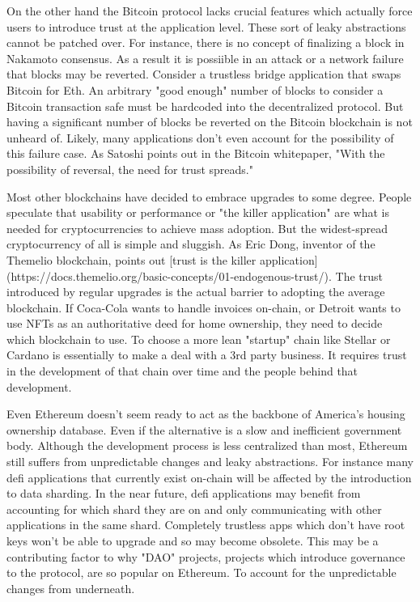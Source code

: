 On the other hand the Bitcoin protocol lacks crucial features which actually force users to introduce trust at the application level. These sort of leaky abstractions cannot be patched over. For instance, there is no concept of finalizing a block in Nakamoto consensus. As a result it is possiible in an attack or a network failure that blocks may be reverted. Consider a trustless bridge application that swaps Bitcoin for Eth. An arbitrary "good enough" number of blocks to consider a Bitcoin transaction safe must be hardcoded into the decentralized protocol. But having a significant number of blocks be reverted on the Bitcoin blockchain is not unheard of. Likely, many applications don't even account for the possibility of this failure case. As Satoshi points out in the Bitcoin whitepaper, "With the possibility of reversal, the need for trust spreads."

Most other blockchains have decided to embrace upgrades to some degree. People speculate that usability or performance or "the killer application" are what is needed for cryptocurrencies to achieve mass adoption. But the widest-spread cryptocurrency of all is simple and sluggish. As Eric Dong, inventor of the Themelio blockchain, points out [trust is the killer application](https://docs.themelio.org/basic-concepts/01-endogenous-trust/). The trust introduced by regular upgrades is the actual barrier to adopting the average blockchain. If Coca-Cola wants to handle invoices on-chain, or Detroit wants to use NFTs as an authoritative deed for home ownership, they need to decide which blockchain to use. To choose a more lean "startup" chain like Stellar or Cardano is essentially to make a deal with a 3rd party business. It requires trust in the development of that chain over time and the people behind that development.

Even Ethereum doesn't seem ready to act as the backbone of America's housing ownership database. Even if the alternative is a slow and inefficient government body. Although the development process is less centralized than most, Ethereum still suffers from unpredictable changes and leaky abstractions. For instance many defi applications that currently exist on-chain will be affected by the introduction to data sharding. In the near future, defi applications may benefit from accounting for which shard they are on and only communicating with other applications in the same shard. Completely trustless apps which don't have root keys won't be able to upgrade and so may become obsolete. This may be a contributing factor to why "DAO" projects, projects which introduce governance to the protocol, are so popular on Ethereum. To account for the unpredictable changes from underneath.

